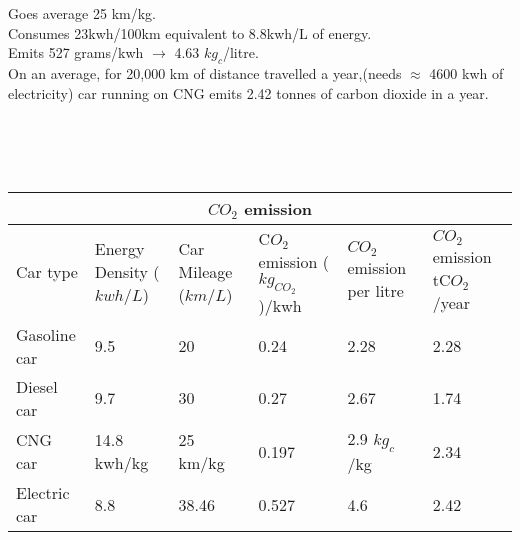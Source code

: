 \documentclass[11pt]{exam}
\begin{document}
\begin{questions}
{\begin{minipage}{42em}
                       Goes average 25 km/kg. \\
                       Consumes 23kwh/100km equivalent to 8.8kwh/L of energy.\\
                       Emits 527 grams/kwh $\rightarrow$ 4.63 $kg_{c}$/litre. \\
                       On an average, for 20,000 km of distance travelled a year,(needs $\approx$ 4600 kwh of electricity) car running on CNG emits 2.42 tonnes of carbon dioxide in a year.\\ \\
\end{minipage}} \\ \\
                  
\begin{tabular}{ |p{2.4cm}||p{2.8cm}|p{2.5cm}|p{2.6cm}|p{2.5cm}|p{2.5cm}| }
\hline
\multicolumn{6}{|c|}{$CO_{2}$ emission} \\
\hline
Car type & Energy Density ($kwh/L$) & Car Mileage ($km/L$) & C$O_{2}$emission  ($kg_{CO_{2}}$)/kwh & $CO_{2}$emission per litre & $CO_{2}$emission tC$O_{2}$/year\\
\hline
Gasoline car  & 9.5 & 20 & 0.24 & 2.28 & 2.28 \\
Diesel car  & 9.7 & 30 & 0.27 & 2.67 & 1.74 \\
CNG car    &  14.8 kwh/kg & 25 km/kg & 0.197 & 2.9 $kg_{c}$/kg &  2.34  \\
Electric car  &  8.8 & 38.46 & 0.527 & 4.6 & 2.42\\
\hline
\end{tabular} \\ \\
\textbf{} \\ \\ \\ \\



\end{questions}
\end{document}
